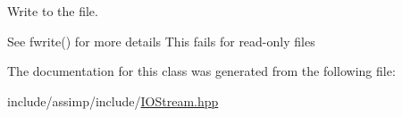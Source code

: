 Write to the file. 

See fwrite() for more details This fails for read-\/only files 

The documentation for this class was generated from the following file\-:\begin{DoxyCompactItemize}
\item 
include/assimp/include/\hyperlink{_i_o_stream_8hpp}{I\-O\-Stream.\-hpp}\end{DoxyCompactItemize}
